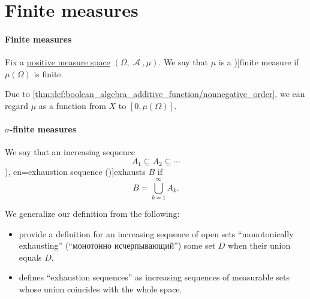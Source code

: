 \section{Finite measures}\label{sec:finite_measures}

\paragraph{Finite measures}

\begin{definition}\label{def:finite_measure}
  Fix a \hyperref[def:measure/positive]{positive measure space} \( (\Omega, \mscrA, \mu) \). We say that \( \mu \) is a \term[bg=крайна мярка (\cite[def. 3.11]{Драганов2022ТеорияНаМярката})]{finite measure} if \( \mu(\Omega) \) is finite.

  Due to \cref{thm:def:boolean_algebra_additive_function/nonnegative_order}, we can regard \( \mu \) as a function from \( X \) to \( [0, \mu(\Omega)] \).
\end{definition}

\paragraph{\( \sigma \)-finite measures}

\begin{definition}\label{def:exhausting_sequence}\mimprovised
  We say that an increasing sequence
  \begin{equation*}
    A_1 \subseteq A_2 \subseteq \cdots
  \end{equation*}
  \term[ru=монотонно исчерпывает (\cite[def. 3.8.1]{ИльинСадовничийСендов1987АнализТом2}), en=exhaustion sequence (\cite[13]{Malliavin1995IntegrationAndProbability})]{exhausts} \( B \) if
  \begin{equation*}
    B = \bigcup_{k=1}^\infty A_k.
  \end{equation*}
\end{definition}
\begin{comments}
  \item We generalize our definition from the following:
  \begin{itemize}
    \item {} provide a definition for an increasing sequence of open sets \enquote{monotonically exhausting} (\enquote{монотонно исчерпывающий}) some set \( D \) when their union equals \( D \).

    \item {} defines \enquote{exhaustion sequences} as increasing sequences of measurable sets whose union coincides with the whole space.
  \end{itemize}
\end{comments}

